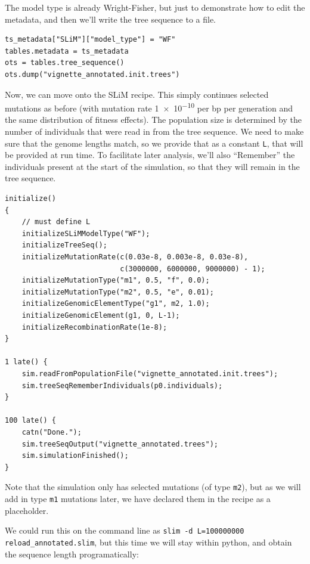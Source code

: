 \documentclass[12pt]{article}
\begin{document}
The model type is already Wright-Fisher,
but just to demonstrate how to edit the metadata,
and then we’ll write the tree sequence to a file.

\begin{listing}[H]
    \begin{verbatim}
ts_metadata["SLiM"]["model_type"] = "WF"
tables.metadata = ts_metadata
ots = tables.tree_sequence()
ots.dump("vignette_annotated.init.trees")
    \end{verbatim}
\end{listing}   

Now, we can move onto the SLiM recipe.
This simply continues selected mutations as before (with mutation rate \num{1e-10} per bp per generation and the same distribution of fitness effects).
The population size is determined by the number of individuals that were read in from the tree sequence.
We need to make sure that the genome lengths match, so we provide that as a constant \verb|L|, that will be provided at run time.
To facilitate later analysis, we’ll also “Remember” the individuals present at the start of the simulation,
so that they will remain in the tree sequence.
\begin{lstlisting}[language=slim]
initialize()
{
    // must define L
    initializeSLiMModelType("WF");
    initializeTreeSeq();
    initializeMutationRate(c(0.03e-8, 0.003e-8, 0.03e-8),
                           c(3000000, 6000000, 9000000) - 1);
    initializeMutationType("m1", 0.5, "f", 0.0);
    initializeMutationType("m2", 0.5, "e", 0.01);
    initializeGenomicElementType("g1", m2, 1.0);
    initializeGenomicElement(g1, 0, L-1);
    initializeRecombinationRate(1e-8);
}

1 late() { 
    sim.readFromPopulationFile("vignette_annotated.init.trees");
    sim.treeSeqRememberIndividuals(p0.individuals);
}

100 late() {
    catn("Done.");
    sim.treeSeqOutput("vignette_annotated.trees");
    sim.simulationFinished();
}

\end{lstlisting}

Note that the simulation only has selected mutations (of type \verb|m2|),
but as we will add in type \verb|m1| mutations later,
we have declared them in the recipe as a placeholder.

We could run this on the command line as \verb|slim -d L=100000000 reload_annotated.slim|,
but this time we will stay within python, and obtain the sequence length programatically:
\end{document}
